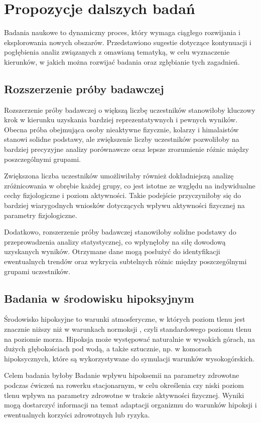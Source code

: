 \section{Propozycje dalszych badań}
Badania naukowe to dynamiczny proces, który wymaga ciągłego rozwijania i eksplorowania nowych obszarów. Przedstawiono sugestie dotyczące kontynuacji i pogłębienia analiz związanych z omawianą tematyką, w celu wyznaczenie kierunków, w jakich można rozwijać badania oraz zgłębianie tych zagadnień.

\subsection{Rozszerzenie próby badawczej}
Rozszerzenie próby badawczej o większą liczbę uczestników stanowiłoby kluczowy krok w kierunku uzyskania bardziej reprezentatywnych i pewnych wyników. Obecna próba obejmująca osoby nieaktywne fizycznie, kolarzy i himalaistów stanowi solidne podstawy, ale zwiększenie liczby uczestników pozwoliłoby na bardziej precyzyjne analizy porównawcze oraz lepsze zrozumienie różnic między poszczególnymi grupami.

Zwiększona liczba uczestników umożliwiłaby również dokładniejszą analizę zróżnicowania w obrębie każdej grupy, co jest istotne ze względu na indywidualne cechy fizjologiczne i poziom aktywności. Takie podejście przyczyniłoby się do bardziej wiarygodnych wniosków dotyczących wpływu aktywności fizycznej na parametry fizjologiczne.

Dodatkowo, rozszerzenie próby badawczej stanowiłoby solidne podstawy do przeprowadzenia analizy statystycznej, co wpłynęłoby na siłę dowodową uzyskanych wyników. Otrzymane dane mogą posłużyć do identyfikacji ewentualnych trendów oraz wykrycia subtelnych różnic między poszczególnymi grupami uczestników.
\subsection{Badania w środowisku hipoksyjnym}
Środowisko hipoksyjne to warunki atmosferyczne, w których poziom tlenu jest znacznie niższy niż w warunkach normoksji \cite{hipoksja}, czyli standardowego poziomu tlenu na poziomie morza. Hipoksja może występować naturalnie w wysokich górach, na dużych głębokościach pod wodą, a także sztucznie, np. w komorach hipoksycznych, które są wykorzystywane do symulacji warunków wysokogórskich.

Celem badania byłoby Badanie wpływu hipoksemii na parametry zdrowotne podczas ćwiczeń na rowerku stacjonarnym, w celu określenia czy niski poziom tlenu wpływa na parametry zdrowotne w trakcie aktywności fizycznej. Wyniki mogą dostarczyć informacji na temat adaptacji organizmu do warunków hipoksji i ewentualnych korzyści zdrowotnych lub ryzyka.